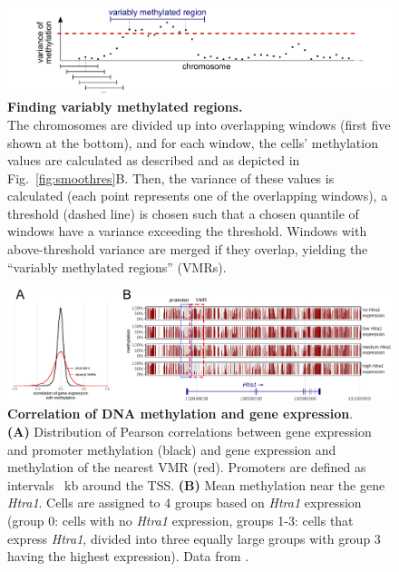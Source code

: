 \documentclass[10pt]{article}
\begin{document}
\begin{figure}[p]
	\begin{center}
		\includegraphics[width=.7\columnwidth]{figures/Fig_sliding.pdf}
	\end{center}
	\caption{\small \textbf{Finding variably methylated regions.}\\
		The chromosomes are divided up into overlapping windows (first five shown at the bottom), and for each window, the cells' methylation values are calculated as described and as depicted in Fig.~\ref{fig:smoothres}B.
		Then, the variance of these values is calculated (each point represents one of the overlapping windows), a threshold (dashed line) is chosen such that a chosen quantile of windows have a variance exceeding the threshold.
		Windows with above-threshold variance are merged if they overlap, yielding the ``variably methylated regions'' (VMRs).}
	\label{fig:vmr}
\end{figure}


\begin{figure}[p]
	\begin{center}
		\includegraphics[width=\textwidth]{figures/Fig_correlation.pdf}
	\end{center}
	\caption{\small \textbf{Correlation of DNA methylation and gene expression}.\\
		\textbf{(A)} Distribution of Pearson correlations between gene expression and promoter methylation (black) and gene expression and methylation of the nearest VMR (red).
		Promoters are defined as intervals ~kb around the TSS.
		\textbf{(B)} Mean methylation near the gene \textit{Htra1}.
		Cells are assigned to 4 groups based on \textit{Htra1} expression (group 0: cells with no \textit{Htra1} expression, groups 1-3: cells that express \textit{Htra1}, divided into three equally large groups with group 3 having the highest expression).
		Data from \citet{kremer_scnmt}.}
	\label{fig:correlation}
\end{figure}
\end{document}
